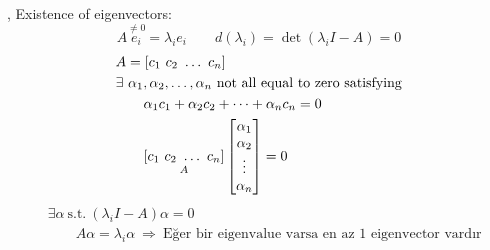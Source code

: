 \sep
\point Existence of eigenvectors:
\[
A\overset{\neq0}{e_i}=\lambda_ie_i\qquad d(\lambda_i)=\det(\lambda_iI-A)=0
\]
\begin{align*}
&A=[c_1\ c_2\ \dots\ c_n]\\
&\exists\ \alpha_1,\alpha_2,\dots,\alpha_n\text{ not all equal to zero satisfying}\\
&\qquad\alpha_1c_1+\alpha_2c_2+\dots+\alpha_nc_n=0\\
&\qquad\underset{A}{[c_1\ c_2\ \dots\ c_n]}\bmat{\alpha_1\\\alpha_2\\\vdots\\\alpha_n}=0
\end{align*}
\begin{align*}
&\exists\alpha\ \text{s.t.}\ (\lambda_iI-A)\alpha=0\\
&\qquad A\alpha=\lambda_i\alpha\ \Rightarrow\ \text{Eğer bir eigenvalue varsa en az 1 eigenvector vardır}
\end{align*}


